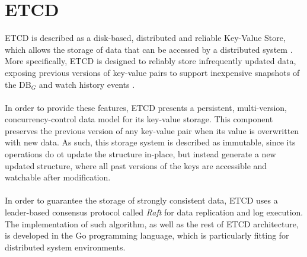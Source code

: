 \section{ETCD}
ETCD is described as a disk-based, distributed and reliable Key-Value Store, which allows the storage of data that can be accessed by a distributed system \cite{site:etcd-desc}. More specifically, ETCD is designed to reliably store infrequently updated data, exposing previous versions of key-value pairs to support inexpensive snapshots of the DB$_G$ and watch history events \cite{site:etcd-data-model}. \\ \\
In order to provide these features, ETCD presents a persistent, multi-version, concurrency-control data model for its key-value storage. This component preserves the previous version of any key-value pair when its value is overwritten with new data. As such, this storage system is described as immutable, since its operations do ot update the structure in-place, but instead generate a new updated structure, where all past versions of the keys are accessible and watchable after modification. \\ \\
In order to guarantee the storage of strongly consistent data, ETCD uses a leader-based consensus protocol called \textit{Raft} for data replication and log execution. The implementation of such algorithm, as well as the rest of ETCD architecture, is developed in the Go programming language, which is particularly fitting for distributed system environments.

